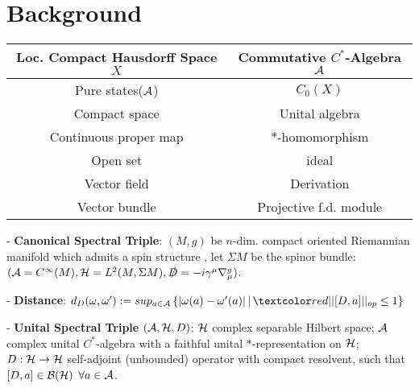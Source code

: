 \section{Background}

\begin{frame} %
    
    
    
    
    \begin{table}[h]
        \centering
        \begin{tabular}{c|c}
             Loc. Compact Hausdorff Space $X$ & Commutative $C^*$-Algebra $\mathcal A$\\
             \hline
             Pure states($\mathcal A$) & $C_0(X)$ \\
             Compact space & Unital algebra \\
             Continuous proper map & $*$-homomorphism \\
             Open set & ideal \\
             Vector field & Derivation \\
             Vector bundle & Projective f.d. module
        \end{tabular}
        
        \label{tab:my_label}
    \end{table}
    
    - \textbf{Canonical Spectral Triple}: $(M, g)$ be $n$-dim. compact oriented Riemannian manifold which admits a spin structure%
    , let $\Sigma M$ %
    be the spinor bundle: $(\mathcal A = C^\infty(M), \mathcal H = L^2(M, \Sigma M), \slashed D = -i \gamma^\mu \nabla^g_\mu)$.
    
    - \textbf{Distance}: $d_D(\omega, \omega') := sup_{a \in \acal} \left\{|\omega(a) - \omega'(a)| \, | \, \rtext{||[D, a]||_{op} \leq 1} \right\}$
    
    - \textbf{Unital Spectral Triple} $(\mathcal A , \mathcal H, D)$: $\mathcal H$ complex separable Hilbert space; $\mathcal A$ complex unital $C^*$-algebra with a faithful unital $*$-representation on $\mathcal H$; $D: \mathcal H \to \mathcal H$ self-adjoint (unbounded) operator with compact resolvent, such that $[D, a] \in \mathcal B(\mathcal H)$ $\forall a \in \mathcal A$.
\end{frame}